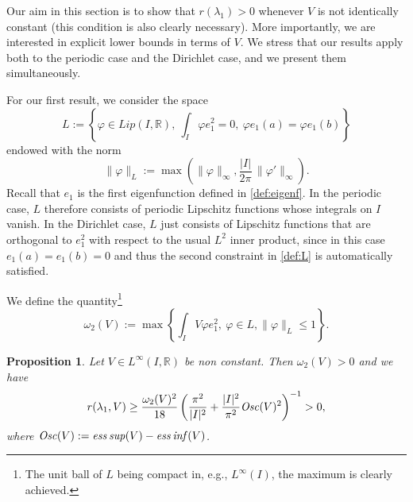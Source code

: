 \documentclass[12pt]{article}
\newtheorem{prop}{Proposition}
\newcommand{\R}{\mathbb{R}}
\begin{document}
Our aim in this section is to show that $r(\lambda_1) > 0$   
whenever $V$ is not identically constant (this condition is 
also clearly necessary). More importantly, we are interested 
in explicit lower bounds in terms of $V$. We stress that our results apply both to the 
periodic case and the Dirichlet case, and we present them simultaneously.

\medskip

For our first result, we consider the space
\begin{equation}\label{def:L}
    L := \left\{ \varphi \in Lip(I,\R),\ \int_I\varphi e_1^2 = 0, \ \varphi e_1(a) =
\varphi
e_1(b) \right\}
\end{equation}
endowed with the norm
$$
\|\varphi\|_L := \max\left(\|\varphi\|_\infty, \frac{|I|}{2\pi}\, \|\varphi'\|_\infty\right).
$$
Recall that $e_1$ is the first eigenfunction defined in \eqref{def:eigenf}. 
In the periodic case, $L$ therefore consists of periodic Lipschitz functions whose 
integrals on $I$ vanish. In the Dirichlet case, $L$ just consists of Lipschitz 
functions that are orthogonal to $e^2_1$ with respect to the usual $L^2$ inner 
product, since in this case $e_1(a)=e_1(b)=0$ and thus the second constraint in 
\eqref{def:L} is automatically satisfied.
 
We define the quantity\footnote{The unit ball of $L$ being compact in, e.g.,
$L^\infty(I)$, the maximum is clearly achieved.}
\begin{equation}\label{eq:defomega2}
	\omega_2(V) := \max \left\{\int_I V\varphi e_1^2,\ \varphi \in L,
	\|\varphi\|_L \leq 1\right\}.
\end{equation}

\begin{prop}\label{prop:v1} 
Let $V \in L^\infty(I,\R)$ be non constant. Then $\omega_2(V) > 0$ and we have  
\begin{equation}\label{eq:prop1}
r(\lambda_1, V) \geq \frac{\omega_2(V)^2}{18} 
\left( \frac{\pi^2}{|I|^2} + \frac{|I|^2}{\pi^2} {\it Osc}(V)^2\right)^{-1} > 0,
\end{equation}
where ${\it Osc}(V) := {\it ess\,sup}(V) - {\it ess\,inf}(V)$.
\end{prop}
\end{document}
